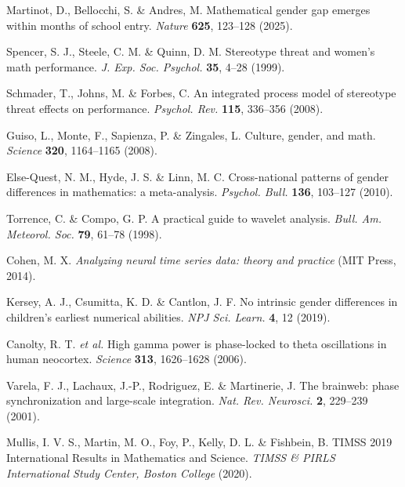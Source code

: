 \documentclass[pdflatex,sn-nature]{sn-jnl}%
\theoremstyle{thmstyleone}%
\theoremstyle{thmstyletwo}%
\theoremstyle{thmstylethree}%
\begin{document}
\begin{thebibliography}{99}

Martinot, D., Bellocchi, S. \& Andres, M. Mathematical gender gap emerges within months of school entry. \textit{Nature} \textbf{625}, 123--128 (2025).

Spencer, S. J., Steele, C. M. \& Quinn, D. M. Stereotype threat and women's math performance. \textit{J. Exp. Soc. Psychol.} \textbf{35}, 4--28 (1999).

Schmader, T., Johns, M. \& Forbes, C. An integrated process model of stereotype threat effects on performance. \textit{Psychol. Rev.} \textbf{115}, 336--356 (2008).

Guiso, L., Monte, F., Sapienza, P. \& Zingales, L. Culture, gender, and math. \textit{Science} \textbf{320}, 1164--1165 (2008).

Else-Quest, N. M., Hyde, J. S. \& Linn, M. C. Cross-national patterns of gender differences in mathematics: a meta-analysis. \textit{Psychol. Bull.} \textbf{136}, 103--127 (2010).

Torrence, C. \& Compo, G. P. A practical guide to wavelet analysis. \textit{Bull. Am. Meteorol. Soc.} \textbf{79}, 61--78 (1998).

Cohen, M. X. \textit{Analyzing neural time series data: theory and practice} (MIT Press, 2014).

Kersey, A. J., Csumitta, K. D. \& Cantlon, J. F. No intrinsic gender differences in children's earliest numerical abilities. \textit{NPJ Sci. Learn.} \textbf{4}, 12 (2019).

Canolty, R. T. \textit{et al.} High gamma power is phase-locked to theta oscillations in human neocortex. \textit{Science} \textbf{313}, 1626--1628 (2006).

Varela, F. J., Lachaux, J.-P., Rodriguez, E. \& Martinerie, J. The brainweb: phase synchronization and large-scale integration. \textit{Nat. Rev. Neurosci.} \textbf{2}, 229--239 (2001).

Mullis, I. V. S., Martin, M. O., Foy, P., Kelly, D. L. \& Fishbein, B. TIMSS 2019 International Results in Mathematics and Science. \textit{TIMSS \& PIRLS International Study Center, Boston College} (2020).


\end{thebibliography}
\end{document}
